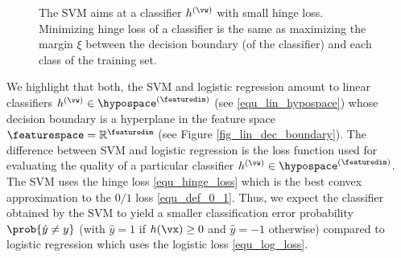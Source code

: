 \documentclass[12pt]{report}
\begin{document}

\begin{figure}[htbp]
\begin{center}
\caption{The SVM aims at a classifier $h^{(\vw)}$ with small hinge loss. 
	Minimizing hinge loss of a classifier is the same as maximizing the 
	margin $\xi$ between the decision boundary (of the classifier) and 
	each class of the training set.}
\label{fig_svm}
\end{center}
\end{figure}

We highlight that both, the SVM and logistic regression amount to linear 
classifiers $h^{(\vw)} \in \hypospace^{(\featuredim)}$ (see \eqref{equ_lin_hypospace}) 
whose decision boundary is a hyperplane in the feature space $\featurespace = \mathbb{R}^{\featuredim}$ (see Figure \ref{fig_lin_dec_boundary}). The difference between SVM and logistic regression is the loss function used for 
evaluating the quality of a particular classifier $h^{(\vw)} \in \hypospace^{(\featuredim)}$. 
The SVM uses the hinge loss \eqref{equ_hinge_loss} which is the best 
convex approximation to the $0/1$ loss \eqref{equ_def_0_1}. Thus, we 
expect the classifier obtained by the SVM to yield a smaller classification 
error probability $\prob{ \hat{y} \neq y }$ (with $\hat{y} =1$ if $h(\vx)\geq0$ and 
$\hat{y}=-1$ otherwise) compared to logistic regression which uses 
the logistic loss \eqref{equ_log_loss}. 
\end{document}
